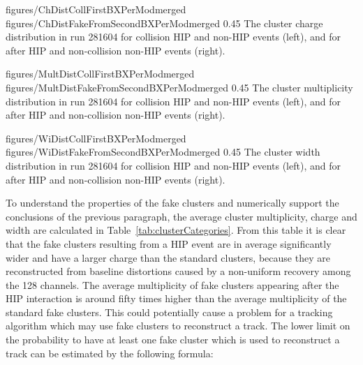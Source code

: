                  {figures/ChDistCollFirstBXPerModmerged} %
                 {figures/ChDistFakeFromSecondBXPerModmerged} %
                 {0.45}       %
                 { The cluster charge distribution in run 281604 for collision HIP and non-HIP events (left), and for after HIP and non-collision non-HIP events (right).   } %

                 {figures/MultDistCollFirstBXPerModmerged} %
                 {figures/MultDistFakeFromSecondBXPerModmerged} %
                 {0.45}       %
                 { The cluster multiplicity distribution in run 281604 for collision HIP and non-HIP events (left), and for after HIP and non-collision non-HIP events (right). } %

                 {figures/WiDistCollFirstBXPerModmerged} %
                 {figures/WiDistFakeFromSecondBXPerModmerged} %
                 {0.45}       %
                 {  The cluster width distribution in run 281604 for collision HIP and non-HIP events (left), and for after HIP and non-collision non-HIP events (right).} %


To understand the properties of the fake clusters and numerically support the conclusions of the previous paragraph, the average cluster multiplicity, charge and width are calculated in Table~\ref{tab:clusterCategories}. From this table it is clear that the fake clusters resulting from a HIP event are in average significantly wider and have a larger charge than the standard clusters, because they are reconstructed from baseline distortions caused by a non-uniform recovery among the 128 channels. The average multiplicity of fake clusters appearing after the HIP interaction is around fifty times higher than the average multiplicity of the standard fake clusters. This could potentially cause a problem for a tracking algorithm which may use fake clusters to reconstruct a track. The lower limit on the probability to have at least one fake cluster which is used to reconstruct a track can be estimated by the following formula:


